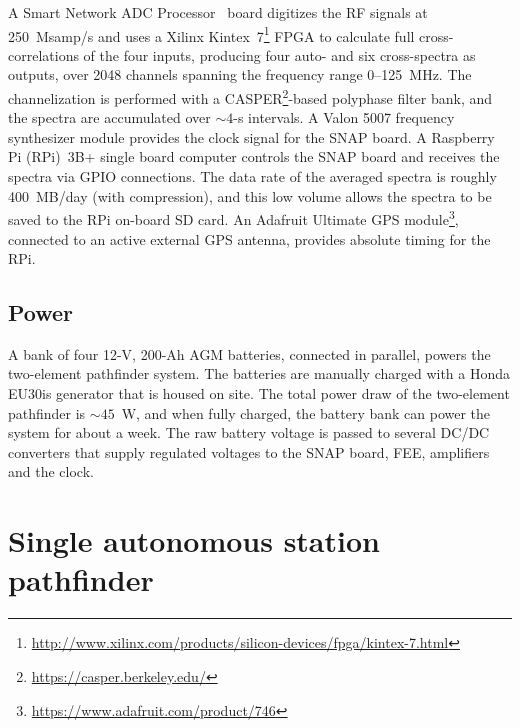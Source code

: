 \documentclass{ws-jai}
\begin{document}
A Smart Network ADC Processor~\citep[SNAP;][]{2016JAI.....541001H}
board digitizes the RF signals at 250~Msamp/s and uses a Xilinx
Kintex~7\footnote{\url{http://www.xilinx.com/products/silicon-devices/fpga/kintex-7.html}}
FPGA to calculate full cross-correlations of the four inputs,
producing four auto- and six cross-spectra as outputs, over 2048
channels spanning the frequency range 0--125~MHz.  The channelization
is performed with a
CASPER\footnote{\url{https://casper.berkeley.edu/}}-based polyphase
filter bank, and the spectra are accumulated over $\sim4$-s intervals.
A Valon 5007 frequency synthesizer module provides the clock signal
for the SNAP board.  A Raspberry Pi (RPi)~3B+ single board computer
controls the SNAP board and receives the spectra via GPIO connections.
The data rate of the averaged spectra is roughly 400~MB/day (with
compression), and this low volume allows the spectra to be saved to
the RPi on-board SD card.  An Adafruit Ultimate GPS
module\footnote{\url{https://www.adafruit.com/product/746}}, connected
to an active external GPS antenna, provides absolute timing for the
RPi.


\subsection{Power}

A bank of four 12-V, 200-Ah AGM batteries, connected in parallel,
powers the two-element pathfinder system.  The batteries are manually
charged with a Honda EU30is generator that is housed on site.  The
total power draw of the two-element pathfinder is $\sim45$~W, and when
fully charged, the battery bank can power the system for about a week.
The raw battery voltage is passed to several DC/DC converters that
supply regulated voltages to the SNAP board, FEE, amplifiers and the
clock.


\section{Single autonomous station pathfinder}
\end{document}
